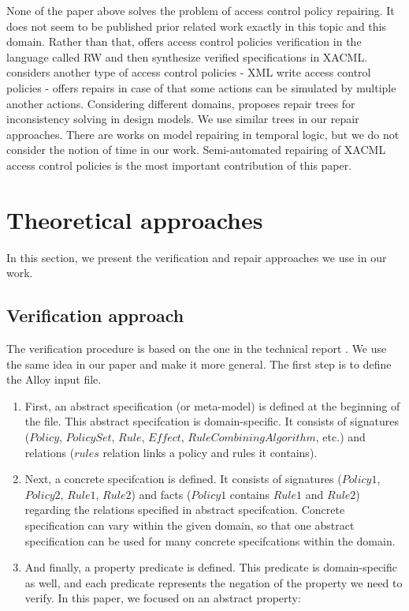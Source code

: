 \documentclass[letterpaper]{acm_proc_article-sp}
\begin{document}
None of the paper above solves the problem of access control policy repairing. It does not seem to be published prior related work exactly in this topic and this domain. Rather than that, \cite{Zhang:2004:SVA:1029133.1029141} offers access control policies verification in the language called RW and then synthesize verified specifications in XACML. \cite{Bravo:2007:RIX:1783534.1783545} considers another type of access control policies - XML write access control policies - offers repairs in case of that some actions can be simulated by multiple another actions. Considering different domains, \cite{Reder:2012:CRT:2351676.2351707} proposes repair trees for inconsistency solving in design models. We use similar trees in our repair approaches. There are works on model repairing in temporal logic, but we do not consider the notion of time in our work. Semi-automated repairing of XACML access control policies is the most important contribution of this paper. 

\section{Theoretical approaches}

In this section, we present the verification and repair approaches we use in our work.

\subsection{Verification approach}
\label{sec:verification}

The verification procedure is based on the one in the technical report \cite{acp:alloy}. We use the same idea in our paper and make it more general.
The first step is to define the Alloy input file.

\begin{enumerate}
\item First, an abstract specification  (or meta-model) is defined at the beginning of the file. This abstract specifcation is domain-specific. It consists of signatures ($Policy$, $PolicySet$, $Rule$, $Effect$, $RuleCombiningAlgorithm$, etc.) and relations ($rules$ relation links a policy and rules it contains).

\item Next, a concrete specifcation is defined. It consists of signatures ($Policy1$, $Policy2$, $Rule1$, $Rule2$) and facts ($Policy1$ contains $Rule1$ and $Rule2$) regarding the relations specified in abstract specifcation. Concrete specification can vary within the given domain, so that one abstract specification can be used for many concrete specifcations within the domain.

\item And finally, a property predicate is defined. This predicate is domain-specific as well, and each predicate represents the negation of the property we need to verify. In this paper, we focused on an abstract property: 
\end{enumerate}
\end{document}
